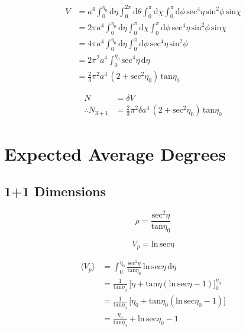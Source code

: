 \documentclass[12pt]{article}
\begin{document}
\begin{equation}
\begin{split}
V &= a^4 \int_0^{\eta_0} \! \mathrm{d}\eta \int_0^{2\pi} \! \mathrm{d}\theta \int_0^\pi \! \mathrm{d}\chi \int_0^\pi \! \mathrm{d}\phi \, \mathrm{sec}^4\eta \, \mathrm{sin}^2\phi \, \mathrm{sin}\chi \\
  &= 2\pi a^4 \int_0^{\eta_0} \! \mathrm{d}\eta \int_0^\pi \! \mathrm{d}\chi \int_0^\pi \! \mathrm{d}\phi \, \mathrm{sec}^4\eta \, \mathrm{sin}^2\phi \, \mathrm{sin}\chi \\
  &= 4\pi a^4 \int_0^{\eta_0} \! \mathrm{d}\eta \int_0^\pi \! \mathrm{d}\phi \, \mathrm{sec}^4\eta \, \mathrm{sin}^2\phi \\
  &= 2\pi^2 a^4 \int_0^{\eta_0} \! \mathrm{sec}^4\eta \, \mathrm{d}\eta \\
  &= \frac{2}{3}\pi^2 a^4 \, (2+\mathrm{sec}^2\eta_0) \, \mathrm{tan}\eta_0
\end{split}
\end{equation}

\begin{equation}
\begin{split}
N &= \delta V \\
\therefore N_{\mathrm{3+1}} &= \frac{2}{3}\pi^2\delta a^4 \, (2+\mathrm{sec}^2\eta_0) \, \mathrm{tan}\eta_0
\end{split}
\end{equation}

\section{Expected Average Degrees}
\subsection{1+1 Dimensions}

\begin{equation}
\rho = \frac{\mathrm{sec}^2\eta}{\mathrm{tan}\eta_0}
\end{equation}

\begin{equation}
V_p = \mathrm{ln} \, \mathrm{sec}\eta
\end{equation}

\begin{equation}
\begin{split}
\langle V_p \rangle &= \int_0^{\eta_0} \! \frac{\mathrm{sec}^2\eta}{\mathrm{tan}\eta_0} \, \mathrm{ln} \, \mathrm{sec}\eta \, \mathrm{d}\eta \\
  &= \frac{1}{\mathrm{tan}\eta_0} \, \lbrack \eta + \mathrm{tan}\eta (\mathrm{ln} \, \mathrm{sec}\eta - 1) \rbrack_0^{\eta_0} \\
  &= \frac{1}{\mathrm{tan}\eta_0} \, \lbrack \eta_0 + \mathrm{tan}\eta_0 (\mathrm{ln} \, \mathrm{sec}\eta_0 - 1) \rbrack \\
  &= \frac{\eta_0}{\mathrm{tan}\eta_0} + \mathrm{ln} \, \mathrm{sec}\eta_0 - 1
\end{split}
\end{equation}
\end{document}

